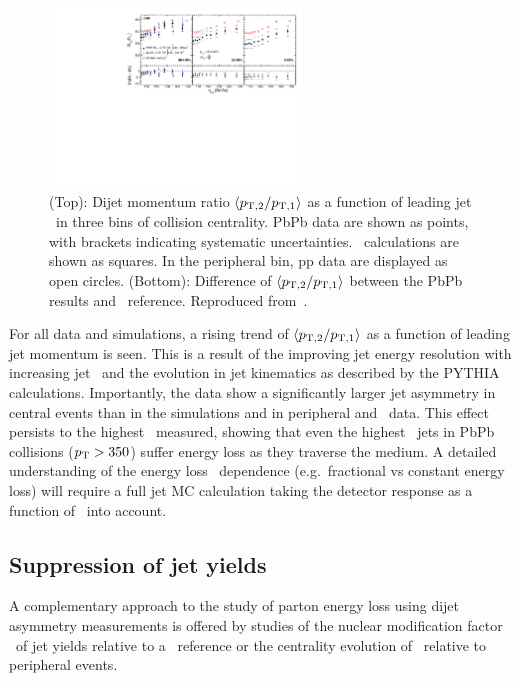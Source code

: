 \begin{figure}[!h]
\begin{center}
\includegraphics[width=0.6\textwidth]{jetfigures/deltaPtOverPt5_lead120_sub30_diff_20120103.pdf}
\caption{(Top): Dijet momentum ratio $\langle p_{\rm{T},2}/p_{\rm{T},1} \rangle$ as a function of
leading jet \pT\ in three bins of collision centrality.
PbPb data are shown as points, with brackets indicating systematic uncertainties.  
\PYTHYD\ calculations are shown as squares. In the peripheral bin,
pp data are displayed as open circles.
(Bottom): Difference of $\langle p_{\rm{T},2}/p_{\rm{T},1} \rangle$ between the PbPb results and \PYTHYD\ reference.
Reproduced from~\cite{CMS_dijet}.}
\label{fig:GR:CMS_pt_ratio}
\end{center}
\end{figure}

For all data and simulations, a rising trend of $\langle p_{\rm{T},2}/p_{\rm{T},1} \rangle$ as a function
of leading jet momentum is seen. This is a result of the improving jet energy resolution
with increasing jet \pT\ and the evolution in jet kinematics as described by the PYTHIA 
calculations. Importantly, the data show a significantly larger jet asymmetry in central events
than in the simulations and in peripheral and \pp\ data. This effect persists to the 
highest \pT\ measured, showing that even the highest \pT\ jets in PbPb collisions ($\mbox{$p_{\mathrm{T}}$} > 350$\GeVc)
suffer energy loss as they traverse the medium. A detailed understanding of the energy loss
\pT\ dependence (e.g.\ fractional vs constant energy loss) will require a full jet MC calculation
taking the detector response as a function of \pT\ into account.

\subsection{Suppression of jet yields}

A complementary approach to the study of parton energy loss using dijet asymmetry measurements
is offered by studies of the nuclear modification factor \Raa\ of jet yields relative 
to a \pp\ reference or the centrality evolution of \Rcp\ relative to peripheral events.

